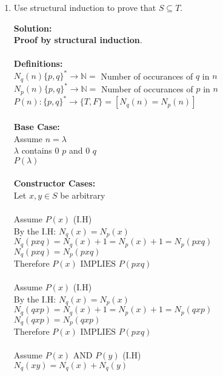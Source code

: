 \documentclass[11pt]{article}
\def\nats {{\mathbb N}}
\newcommand{\Implies}{\mbox{ IMPLIES }}
\newcommand{\And}{\mbox{ AND }}
\begin{document}
\begin{enumerate}
\begin{solution}
\end{solution}

\item
\begin{question}
Use structural induction to prove that $S \subseteq T$.
\end{question}

\begin{solution}
{\bf Solution:}\\
{\bf  Proof by structural induction}.\\\\
{\bf Definitions:}\\
$N_q(n) \{p,q\}^* \rightarrow \nats = $ Number of occurances of $q$ in $n$\\
$N_p(n) \{p,q\}^* \rightarrow \nats = $ Number of occurances of $p$ in $n$\\
$P(n): \{p,q\}^* \rightarrow \{T,F\}= \left[N_q(n) = N_p(n) \right]$\\\\
{\bf Base Case:}\\
\null\quad Assume $n=\lambda$\\
\null\quad $\lambda$ contains $0$ $p$ and $0$ $q$ \\
\null\quad $P(\lambda)$\\\\
{\bf Constructor Cases:}\\
\null\quad Let $x,y\in S$ be arbitrary\\\\
\null\qquad Assume $P(x)$ (I.H)\\
\null\qquad By the I.H: $N_q(x) = N_p(x)$\\
\null\qquad $N_q(pxq) = N_q(x) + 1=N_p(x) + 1= N_p(pxq)$\\
\null\qquad $N_q(pxq) = N_p(pxq)$\\
\null\quad Therefore $P(x)\Implies P(pxq)$\\\\
\null\qquad Assume $P(x)$ (I.H)\\
\null\qquad By the I.H: $N_q(x) = N_p(x)$ \\
\null\qquad $N_q(qxp) = N_q(x) + 1=N_p(x) + 1= N_p(qxp)$\\
\null\qquad $N_q(qxp) = N_p(qxp)$\\
\null\quad Therefore $P(x)\Implies P(pxq)$\\\\
\null\qquad Assume $P(x)\And P(y)$ (I.H)\\
\null\qquad $N_q(xy) = N_q(x) + N_q(y)$\\

\end{solution}
\end{enumerate}
\end{document}

